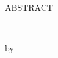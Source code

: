 \thispagestyle{empty}
\begin{center}
\MakeUppercase{ABSTRACT}\\
\vspace*{1\baselineskip}

\MakeUppercase{\thetitle}\\
\vspace*{2\baselineskip}

by \theauthor
\end{center}

\vspace*{4\baselineskip}

\begin{flushleft}

\blindtext

\end{flushleft}
\clearpage